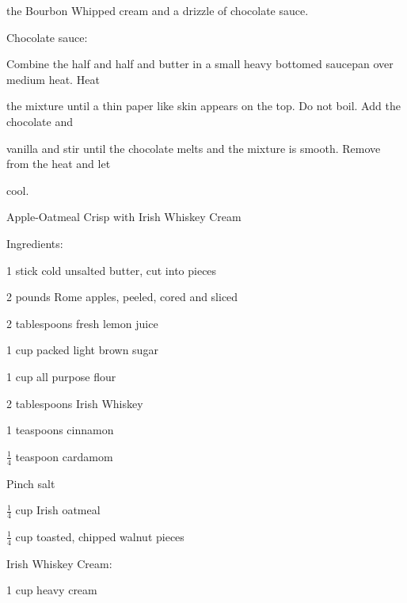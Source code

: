\documentclass[a4paper,portrait,12pt]{book}
\begin{document}
the Bourbon Whipped cream and a drizzle of chocolate sauce.




Chocolate sauce:




Combine the half and half and butter in a small heavy bottomed saucepan over medium heat. Heat




the mixture until a thin paper like skin appears on the top. Do not boil. Add the chocolate and




vanilla and stir until the chocolate melts and the mixture is smooth. Remove from the heat and let




cool.







\newpage
Apple-Oatmeal Crisp with Irish Whiskey Cream




Ingredients:




1 stick cold unsalted butter, cut into pieces




2 pounds Rome apples, peeled, cored and sliced




2 tablespoons fresh lemon juice




1 cup packed light brown sugar




1 cup all purpose flour




2 tablespoons Irish Whiskey




1 teaspoons cinnamon




$\frac{1}{4}$ teaspoon cardamom




Pinch salt




$\frac{1}{4}$ cup Irish oatmeal




$\frac{1}{4}$ cup toasted, chipped walnut pieces




Irish Whiskey Cream:




1 cup heavy cream
\end{document}
